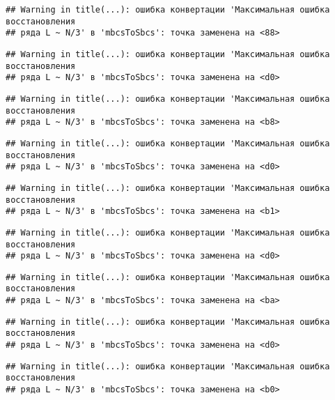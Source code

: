 \documentclass[
]{article}
\begin{document}
\begin{verbatim}
## Warning in title(...): ошибка конвертации 'Максимальная ошибка восстановления
## ряда L ~ N/3' в 'mbcsToSbcs': точка заменена на <88>
\end{verbatim}

\begin{verbatim}
## Warning in title(...): ошибка конвертации 'Максимальная ошибка восстановления
## ряда L ~ N/3' в 'mbcsToSbcs': точка заменена на <d0>
\end{verbatim}

\begin{verbatim}
## Warning in title(...): ошибка конвертации 'Максимальная ошибка восстановления
## ряда L ~ N/3' в 'mbcsToSbcs': точка заменена на <b8>
\end{verbatim}

\begin{verbatim}
## Warning in title(...): ошибка конвертации 'Максимальная ошибка восстановления
## ряда L ~ N/3' в 'mbcsToSbcs': точка заменена на <d0>
\end{verbatim}

\begin{verbatim}
## Warning in title(...): ошибка конвертации 'Максимальная ошибка восстановления
## ряда L ~ N/3' в 'mbcsToSbcs': точка заменена на <b1>
\end{verbatim}

\begin{verbatim}
## Warning in title(...): ошибка конвертации 'Максимальная ошибка восстановления
## ряда L ~ N/3' в 'mbcsToSbcs': точка заменена на <d0>
\end{verbatim}

\begin{verbatim}
## Warning in title(...): ошибка конвертации 'Максимальная ошибка восстановления
## ряда L ~ N/3' в 'mbcsToSbcs': точка заменена на <ba>
\end{verbatim}

\begin{verbatim}
## Warning in title(...): ошибка конвертации 'Максимальная ошибка восстановления
## ряда L ~ N/3' в 'mbcsToSbcs': точка заменена на <d0>
\end{verbatim}

\begin{verbatim}
## Warning in title(...): ошибка конвертации 'Максимальная ошибка восстановления
## ряда L ~ N/3' в 'mbcsToSbcs': точка заменена на <b0>
\end{verbatim}
\end{document}
